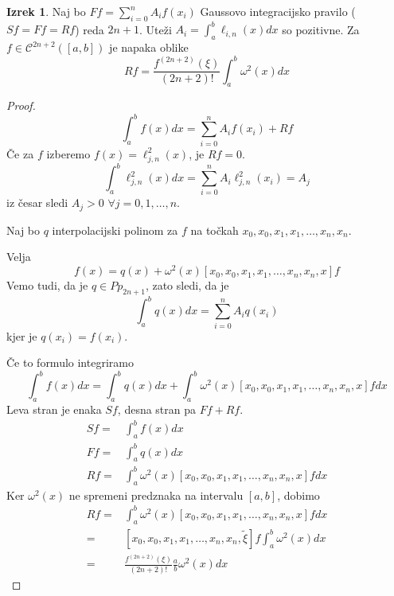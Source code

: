 \documentclass[a4paper,12pt]{article}
\theoremstyle{definition}
\newtheorem{theorem}[counter]{Izrek}
\theoremstyle{remark}
\begin{document}
\begin{theorem}
    Naj bo $F f = \sum_{i=0}^{n} A_i f(x_i)$ Gaussovo integracijsko pravilo ($Sf = Ff = Rf$) reda $2n+1$. Uteži $A_i = \int_{a}^{b} \ell_{i, n}(x) dx$
    so pozitivne. Za $f \in \mathscr{C}^{2n+2}([a, b])$ je napaka oblike
    \begin{equation*}
        Rf = \frac{f^{(2n+2)}(\xi)}{(2n+2)!} \int_{a}^{b} \omega^2 (x) dx
    \end{equation*}
\end{theorem}
\begin{proof}
    \begin{equation*}
        \int_{a}^{b} f(x) dx = \sum_{i=0}^{n} A_i f(x_i) + Rf
    \end{equation*}
    Če za $f$ izberemo $f(x) = \ell_{j, n}^2 (x)$, je $Rf = 0$.
    \begin{equation*}
        \int_{a}^{b} \ell_{j, n}^2 (x) dx = \sum_{i = 0}^{n} A_i \ell_{j, n}^2 (x_i) = A_j
    \end{equation*}
    iz česar sledi $A_j > 0$ $\forall j = 0, 1, \dots, n$.

    Naj bo $q$ interpolacijski polinom za $f$ na točkah $x_0, x_0, x_1, x_1, \dots, x_n, x_n$.
    
    Velja
    \begin{equation*}
        f(x) = q(x) + \omega^2(x) [x_0, x_0, x_1, x_1, \dots, x_n, x_n, x] f
    \end{equation*}
    Vemo tudi, da je $q \in Pp_{2n+1}$, zato sledi, da je
    \begin{equation*}
        \int_{a}^{b} q(x) dx = \sum_{i=0}^{n} A_i q(x_i)
    \end{equation*}
    kjer je $q(x_i) = f(x_i)$.

    Če to formulo integriramo
    \begin{equation*}
        \int_{a}^{b} f(x) dx = \int_{a}^{b} q(x) dx +  \int_{a}^{b} \omega^2(x) [x_0, x_0, x_1, x_1, \dots, x_n, x_n, x] f dx
    \end{equation*}
    Leva stran je enaka $Sf$, desna stran pa $Ff + Rf$.
    \begin{align*}
        Sf =& \int_{a}^{b} f(x) dx\\
        Ff =& \int_{a}^{b} q(x) dx\\
        Rf =& \int_{a}^{b} \omega^2(x) [x_0, x_0, x_1, x_1, \dots, x_n, x_n, x] f dx
    \end{align*}
    Ker $\omega^2(x)$ ne spremeni predznaka na intervalu $[a, b]$, dobimo
    \begin{align*}
        Rf =& \int_{a}^{b} \omega^2(x) [x_0, x_0, x_1, x_1, \dots, x_n, x_n, x] f dx \\
           =& [x_0, x_0, x_1, x_1, \dots, x_n, x_n, \tilde{\xi}] f \int_{a}^{b} \omega^2(x) dx \\
           =& \frac{f^{(2n+2)} (\xi)}{(2n+2)!} \frac{a}{b} \omega^2(x) dx
    \end{align*}
\end{proof}
\end{document}
